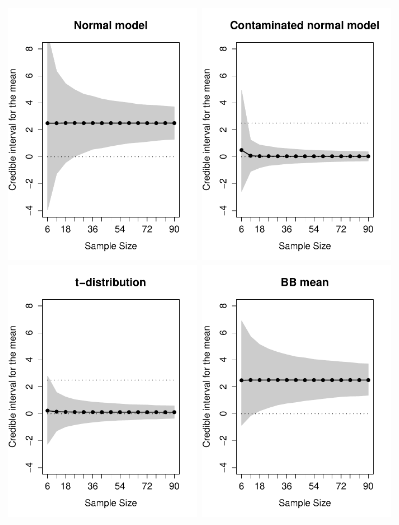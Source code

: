 \documentclass[doc]{apa6}
\begin{document}
{\begin{figure}[p]
    \centering
    \includegraphics[width=5.0cm]{CI2_n.pdf}
    \includegraphics[width=5.0cm]{CI2_cn.pdf}
    \includegraphics[width=5.0cm]{CI2_tModel.pdf}
    \includegraphics[width=5.0cm]{CI2_bbm.pdf}

\end{figure}}
\end{document}
